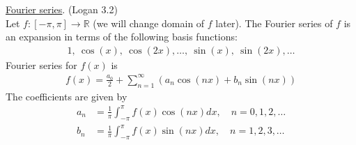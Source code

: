 \documentclass[12pt, letterpaper]{article}
\begin{document}
\underline{Fourier series}. (Logan 3.2) \\
Let $f:[-\pi,\pi] \rightarrow \mathbb{R}$ (we will change domain of $f$ later). The Fourier 
series of $f$ is an expansion in terms of the following basis functions:
\begin{align*}
    1,\ \cos(x),\ \cos(2x),\dots,\ \sin(x),\ \sin(2x),\dots
\end{align*}
Fourier series for $f(x)$ is 
\begin{align*}
    f(x) = \frac{a_0}{2} + \sum_{n=1}^{\infty} (a_n\cos(nx) + b_n \sin(nx))
\end{align*}
The coefficients are given by 
\begin{align*}
    a_n &= \frac{1}{\pi} \int_{-\pi}^{\pi} f(x)\cos(nx)dx,\quad n = 0,1,2,\dots \\
    b_n &= \frac{1}{\pi} \int_{-\pi}^{\pi} f(x)\sin(nx)dx,\quad n = 1,2,3,\dots
\end{align*}
\end{document}
